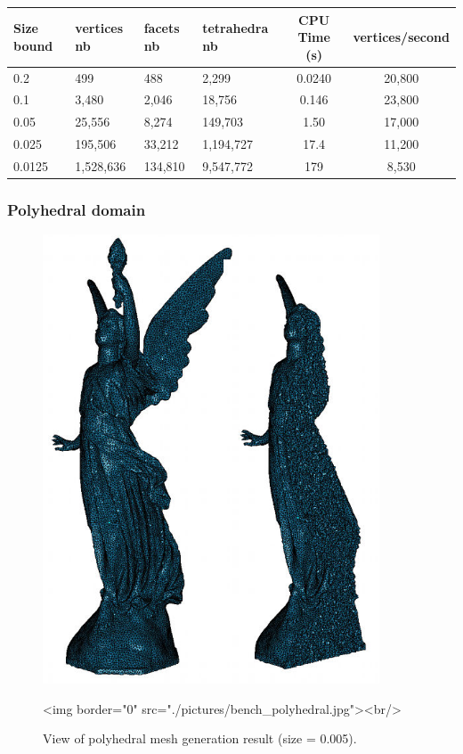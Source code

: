 \begin{center}
\begin{tabular}{|l|l|l|l||c|c|}
  \hline
  Size bound & vertices nb & facets nb & tetrahedra nb & CPU Time (s) & vertices/second\\
  \hline
  0.2 & 499 & 488 & 2,299 & 0.0240 & 20,800 \\
  0.1 & 3,480 & 2,046 & 18,756 & 0.146 & 23,800 \\
  0.05 & 25,556 & 8,274 & 149,703 & 1.50 & 17,000 \\
  0.025 & 195,506 & 33,212 & 1,194,727 & 17.4 & 11,200 \\
  0.0125 & 1,528,636 & 134,810 & 9,547,772 & 179 & 8,530 \\
  \hline
\end{tabular}
\end{center}

\subsubsection{Polyhedral domain}

\begin{figure}[ht]
\begin{center}
 \begin{ccTexOnly}
   \includegraphics[width=10cm]{Mesh_3/pictures/bench_polyhedral.jpg}
 \end{ccTexOnly}
 \begin{ccHtmlOnly}
   <img border="0" src="./pictures/bench_polyhedral.jpg"><br/>
 \end{ccHtmlOnly}
 \caption{View of polyhedral mesh generation result (size = 0.005).}
  \label{figure:mesh_3_benchmark_polyhedral}
\end{center}
\end{figure}

